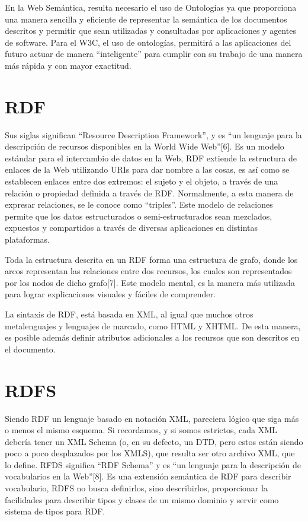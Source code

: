 En la Web Semántica, resulta necesario el uso de Ontologías ya que proporciona una manera sencilla y eficiente de representar la semántica de los documentos descritos y permitir que sean utilizadas y consultadas por aplicaciones y agentes de software. Para el W3C, el uso de ontologías, permitirá a las aplicaciones del futuro actuar de manera ``inteligente'' para cumplir con su trabajo de una manera más rápida y con mayor exactitud.

\section{RDF}

Sus siglas significan ``Resource Description Framework'', y es ``un lenguaje para la descripción de recursos disponibles en la World Wide Web''[6]. Es un modelo estándar para el intercambio de datos en la Web, RDF extiende la estructura de enlaces de la Web utilizando URIs para dar nombre a las cosas, es así como se establecen enlaces entre dos extremos: el sujeto y el objeto, a través de una relación o propiedad definida a través de RDF. Normalmente, a esta manera de expresar relaciones, se le conoce como ``triples''. Este modelo de relaciones permite que los datos estructurados o semi-estructurados sean mezclados, expuestos y compartidos a través de diversas aplicaciones en distintas plataformas.

Toda la estructura descrita en un RDF forma una estructura de grafo, donde los arcos representan las relaciones entre dos recursos, los cuales son representados por los nodos de dicho grafo[7]. Este modelo mental, es la manera más utilizada para lograr explicaciones visuales y fáciles de comprender.

La sintaxis de RDF, está basada en XML, al igual que muchos otros metalenguajes y lenguajes de marcado, como HTML y XHTML. De esta manera, es posible además definir atributos adicionales a los recursos que son descritos en el documento.

\section{RDFS}

Siendo RDF un lenguaje basado en notación XML, pareciera lógico que siga más o menos el mismo esquema. Si recordamos, y si somos estrictos, cada XML debería tener un XML Schema (o, en su defecto, un DTD, pero estos están siendo poco a poco desplazados por los XMLS), que resulta ser otro archivo XML, que lo define. RFDS significa ``RDF Schema'' y es ``un lenguaje para la descripción de vocabularios en la Web''[8]. Es una extensión semántica de RDF para describir vocabulario, RDFS no busca definirlos, sino describirlos, proporcionar la facilidades para describir tipos y clases de un mismo dominio y servir como sistema de tipos para RDF.

